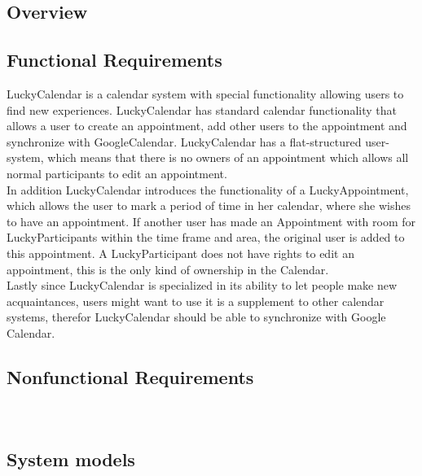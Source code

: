 \subsection{Overview}


\subsection{Functional Requirements}
LuckyCalendar is a calendar system with special functionality allowing users to find new experiences. LuckyCalendar has standard calendar functionality that allows a user to create an appointment, add other users to the appointment and synchronize with GoogleCalendar. LuckyCalendar has a flat-structured user-system, which means that there is no owners of an appointment which allows all normal participants to edit an appointment. \\

In addition LuckyCalendar introduces the functionality of a LuckyAppointment, which allows the user to mark a period of time in her calendar, where she wishes to have an appointment. If another user has made an Appointment with room for LuckyParticipants within the time frame and area, the original user is added to this appointment. A LuckyParticipant does not have rights to edit an appointment, this is the only kind of ownership in the Calendar.\\

Lastly since LuckyCalendar is specialized in its ability to let people make new acquaintances, users might want to use it is a supplement to other calendar systems, therefor LuckyCalendar should be able to synchronize with Google Calendar.


\subsection{Nonfunctional Requirements}				%
	\subsubsection*{}
	\\

\subsection{System models}							%
	